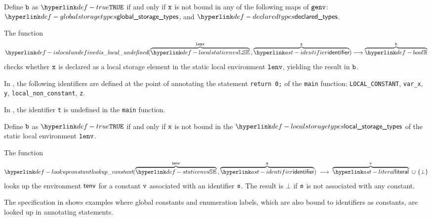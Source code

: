 \ProseParagraph
Define $\vb$ as $\True$ if and only if $\vx$ is not bound in any of the following maps of $\genv$:
$\globalstoragetypes$, and $\declaredtypes$.
\FormallyParagraph
\begin{mathpar}
\end{mathpar}

\hypertarget{def-islocalundefined}{}
The function
\[
\islocalundefined(\overname{\localstaticenvs}{\lenv} \aslsep \overname{\identifier}{\vx}) \aslto \overname{\Bool}{\vb}
\]
checks whether $\vx$ is declared as a local storage element in the static local environment $\lenv$, yielding the result in $\vb$.

In ,
the following identifiers are defined at the point of annotating the statement \verb|return 0;|
of the \verb|main| function:
\verb|LOCAL_CONSTANT|,
\verb|var_x|,
\verb|y|,
\verb|local_non_constant|,
\verb|z|.

In , the identifier \verb|t| is undefined in the \verb|main| function.

\ProseParagraph
Define $\vb$ as $\True$ if and only if $\vx$ is not bound in the $\localstoragetypes$ of the static local environment $\lenv$.
\FormallyParagraph
\begin{mathpar}
\end{mathpar}

\hypertarget{def-lookupconstant}{}
The function
\[
  \lookupconstant(\overname{\staticenvs}{\tenv} \aslsep \overname{\identifier}{\vs})
  \;\aslto\; \overname{\literal}{\vv}\ \cup\ \{\bot\}
\]
looks up the environment $\tenv$ for a constant $\vv$ associated with an identifier
$\vs$. The result is $\bot$ if $\vs$ is not associated with any constant.

The specification in 
shows examples where global constants and enumeration labels,
which are also bound to identifiers as constants, are looked up
in annotating statements.

